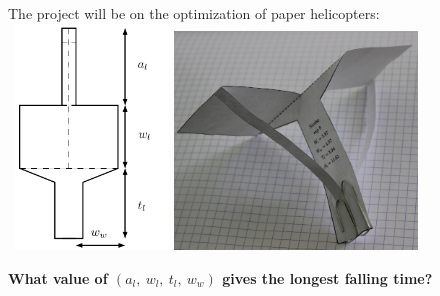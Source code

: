 \documentclass{beamer}
\begin{document}
\begin{frame}{}
The project will be on the optimization of paper helicopters:\\
\vspace{3mm} \
\hspace{-5mm}\includegraphics[height=6cm]{figures/latexdraw/helico} \quad \includegraphics[height=5.8cm]{figures/helicopter2}
\vspace{4mm}
\begin{center}
	\textbf{What value of $(a_l,\ w_l,\ t_l,\ w_w)$ gives the longest falling time?}
\end{center}
\end{frame}
\end{document}
